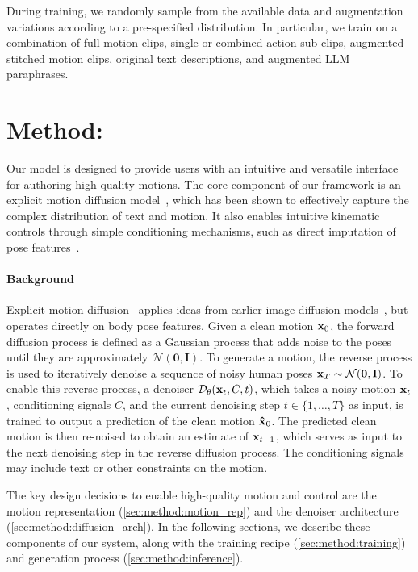 During training, we randomly sample from the available data and augmentation variations according to a pre-specified distribution. In particular, we train on a combination of full motion clips, single or combined action sub-clips, augmented stitched motion clips, original text descriptions, and augmented LLM paraphrases. 

\section{Method: \model}
\label{sec:method}

Our model is designed to provide users with an intuitive and versatile interface for authoring high-quality motions. 
The core component of our framework is an explicit motion diffusion model~\cite{tevet2023mdm,zhang2024motiondiffuse}, which has been shown to effectively capture the complex distribution of text and motion. 
It also enables intuitive kinematic controls through simple conditioning mechanisms, such as direct imputation of pose features~\cite{cohan2024condmdi,shafir2024human}.

\paragraph{Background}
Explicit motion diffusion~\cite{tevet2023mdm,zhang2024motiondiffuse} applies ideas from earlier image diffusion models~\cite{ho2020denoising}, but operates directly on body pose features.
Given a clean motion $\mathbf{x}_0$, the forward diffusion process is defined as a Gaussian process that adds noise to the poses until they are approximately $\mathcal{N}(\mathbf{0}, \mathbf{I})$. 
To generate a motion, the reverse process is used to iteratively denoise a sequence of noisy human poses $\mathbf{x}_T \sim \mathcal{N}(\mathbf{0}, \mathbf{I})$.
To enable this reverse process, a denoiser $\mathcal{D}_\theta(\mathbf{x}_t, C, t)$, which takes a noisy motion $\mathbf{x}_t$, conditioning signals $C$, and the current denoising step $t \in \{1, \dots, T\}$ as input, is trained to output a prediction of the clean motion $\mathbf{\hat{x}}_{0}$. The predicted clean motion is then re-noised to obtain an estimate of $\mathbf{x}_{t-1}$, which serves as input to the next denoising step in the reverse diffusion process. The conditioning signals may include text or other constraints on the motion. 

The key design decisions to enable high-quality motion and control are the motion representation (\cref{sec:method:motion_rep}) and the denoiser architecture (\cref{sec:method:diffusion_arch}). In the following sections, we describe these components of our system, along with the training recipe (\cref{sec:method:training}) and generation process (\cref{sec:method:inference}).

